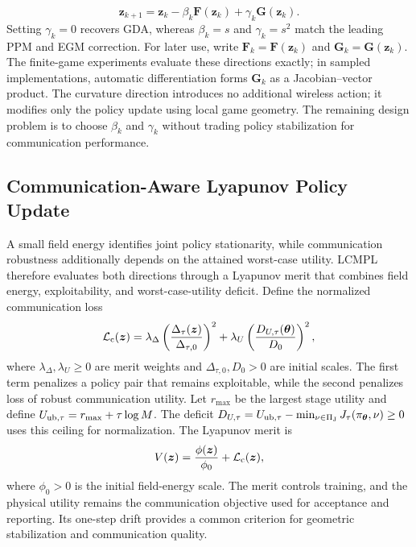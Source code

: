 \documentclass[conference]{IEEEtran}
\newcommand{\bF}{\bm{F}}
\newcommand{\bG}{\bm{G}}
\newcommand{\bz}{\bm{z}}
\newcommand{\btheta}{\bm{\theta}}
\begin{document}
\begin{equation}
\bz_{k+1}=\bz_k-\beta_k\bF(\bz_k)+\gamma_k\bG(\bz_k).
\label{eq:update}
\end{equation}
Setting $\gamma_k=0$ recovers GDA, whereas $\beta_k=s$ and $\gamma_k=s^2$ match the leading PPM and EGM correction.
For later use, write $\bF_k=\bF(\bz_k)$ and $\bG_k=\bG(\bz_k)$.
The finite-game experiments evaluate these directions exactly; in sampled implementations, automatic differentiation forms $\bG_k$ as a Jacobian--vector product.
The curvature direction introduces no additional wireless action; it modifies only the policy update using local game geometry.
The remaining design problem is to choose $\beta_k$ and $\gamma_k$ without trading policy stabilization for communication performance.

\subsection{Communication-Aware Lyapunov Policy Update}
A small field energy identifies joint policy stationarity, while communication robustness additionally depends on the attained worst-case utility.
LCMPL therefore evaluates both directions through a Lyapunov merit that combines field energy, exploitability, and worst-case-utility deficit.
Define the normalized communication loss
\[
\mathcal L_{\rm c}(\bz)=
\lambda_\Delta\left(\frac{\Delta_\tau(\bz)}{\Delta_{\tau,0}}\right)^2
+\lambda_U\left(\frac{D_{U,\tau}(\btheta)}{D_0}\right)^2,
\]
where $\lambda_\Delta,\lambda_U\geq0$ are merit weights and $\Delta_{\tau,0},D_0>0$ are initial scales.
The first term penalizes a policy pair that remains exploitable, while the second penalizes loss of robust communication utility.
Let $r_{\max}$ be the largest stage utility and define $U_{{\rm ub},\tau}=r_{\max}+\tau\log M$.
The deficit $D_{U,\tau}=U_{{\rm ub},\tau}-\min_{\nu\in\Pi_{\rm J}}J_\tau(\pi_{\btheta},\nu)\geq0$ uses this ceiling for normalization.
The Lyapunov merit is
\begin{equation}
V(\bz)=\frac{\phi(\bz)}{\phi_0}+\mathcal L_{\rm c}(\bz),
\label{eq:merit}
\end{equation}
where $\phi_0>0$ is the initial field-energy scale.
The merit controls training, and the physical utility remains the communication objective used for acceptance and reporting.
Its one-step drift provides a common criterion for geometric stabilization and communication quality.
\end{document}
